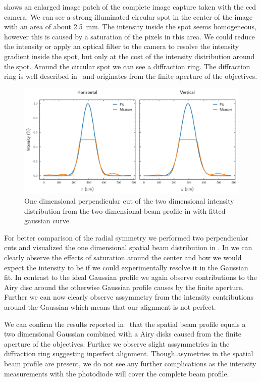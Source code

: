  shows an enlarged image patch of the
complete image capture taken with the \gls{ccd} camera. We can see a strong
illuminated circular spot in the center of the image with an area of about
\SI{2.5}{\milli\meter}. The intensity inside the spot seems homogeneous,
however this is caused by a saturation of the pixels in this area. We could
reduce the intensity or apply an optical filter to the camera to resolve the
intensity gradient inside the spot, but only at the cost of the intensity
distribution around the spot. Around the circular spot we can see a
diffraction ring. The diffraction ring is well described
in~\cite{Hertlein2017} and originates from the finite aperture of the
objectives.
\begin{figure}[htb]
  \centering
  \includegraphics[width=.9\textwidth]{../figure/intensity/profile/profile.pdf}
  \caption{One dimensional perpendicular cut of the two dimensional intensity
    distribution from the two dimensional beam profile in
     with fitted gaussian curve.
  }\label{fig:intensity_spatial_profile}
\end{figure}
For better comparison of the radial symmetry we performed two perpendicular
cuts and visualized the one dimensional spatial beam distribution in
.
In  we can clearly observe the effects of
saturation around the center and how we would expect the intensity to be
if we could experimentally resolve it in the Gaussian fit. In contrast to the
ideal Gaussian profile we again observe contributions to the Airy disc around
the otherwise Gaussian profile causes by the finite aperture. Further we can
now clearly observe assymmetry from the intensity contributions around the
Gaussian which means that our alignment is not perfect.

We can confirm the results reported in~\cite{Hertlein2017} that the spatial
beam profile equals a two dimensional Gaussian combined with a Airy disks
caused from the finite aperture of the objectives. Further we observe
slight assymmetries in the diffraction ring suggesting inperfect alignment.
Though asymetries in the spatial beam profile are present, we do not see any
further complications as the intensity measurements with the photodiode will
cover the complete beam profile.

